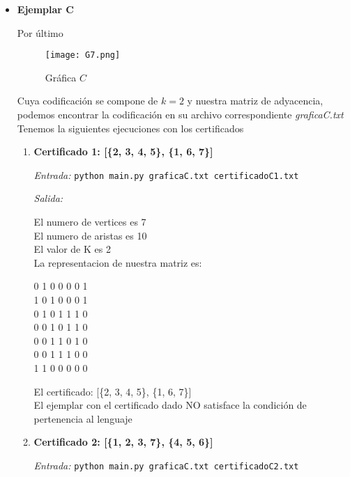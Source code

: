 \documentclass[12pt,letterpaper]{article}
\begin{document}
\begin{itemize}
\begin{itemize}
        \newpage
        \item \textbf{Ejemplar C}
        
        Por último
        
        \begin{figure}[htb]
        \centering
        \texttt{[image: G7.png]}
        \caption{Gráfica $C$}
        \end{figure}
        Cuya codificación se compone de $k=2$ y nuestra matriz de adyacencia, podemos encontrar la codificación en su archivo correspondiente \textit{graficaC.txt}\\
        Tenemos la siguientes ejecuciones con los certificados

    \begin{enumerate}
            \item \textbf{Certificado 1: [\{2, 3, 4, 5\}, \{1, 6, 7\}]}
            
            \textit{Entrada:}
            \texttt{python main.py graficaC.txt certificadoC1.txt}
            
            \textit{Salida:}

            El numero de vertices es 7 \\ 
            El numero de aristas es 10 \\ 
            El valor de K es 2 \\ 
            La representacion de nuestra matriz es:
            \begin{center}
                0 1 0 0 0 0 1 \\ 
                1 0 1 0 0 0 1 \\ 
                0 1 0 1 1 1 0 \\ 
                0 0 1 0 1 1 0 \\ 
                0 0 1 1 0 1 0 \\ 
                0 0 1 1 1 0 0 \\ 
                1 1 0 0 0 0 0 \\ 
            \end{center}
            El certificado: [\{2, 3, 4, 5\}, \{1, 6, 7\}] \\ 
            El ejemplar con el certificado dado NO satisface la condición
            de pertenencia al lenguaje
            
            \newpage
            \item \textbf{Certificado 2: [\{1, 2, 3, 7\}, \{4, 5, 6\}]}
            
            \textit{Entrada:}
            \texttt{python main.py graficaC.txt certificadoC2.txt}
            

\end{enumerate}
\end{itemize}
\end{itemize}
\end{document}
